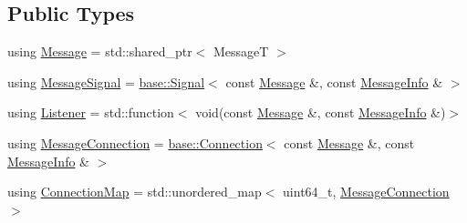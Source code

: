 \subsection*{Public Types}
\begin{DoxyCompactItemize}
\item 
using \hyperlink{classapollo_1_1cyber_1_1transport_1_1ListenerHandler_a52a658e4523db4704b6d7e97f326d774}{Message} = std\-::shared\-\_\-ptr$<$ Message\-T $>$
\item 
using \hyperlink{classapollo_1_1cyber_1_1transport_1_1ListenerHandler_a9ca5ce35c021aae1145e8e25a5fda0a0}{Message\-Signal} = \hyperlink{classapollo_1_1cyber_1_1base_1_1Signal}{base\-::\-Signal}$<$ const \hyperlink{classapollo_1_1cyber_1_1transport_1_1ListenerHandler_a52a658e4523db4704b6d7e97f326d774}{Message} \&, const \hyperlink{classapollo_1_1cyber_1_1transport_1_1MessageInfo}{Message\-Info} \& $>$
\item 
using \hyperlink{classapollo_1_1cyber_1_1transport_1_1ListenerHandler_a96764e623a89ce8a872d2e43b6408d98}{Listener} = std\-::function$<$ void(const \hyperlink{classapollo_1_1cyber_1_1transport_1_1ListenerHandler_a52a658e4523db4704b6d7e97f326d774}{Message} \&, const \hyperlink{classapollo_1_1cyber_1_1transport_1_1MessageInfo}{Message\-Info} \&)$>$
\item 
using \hyperlink{classapollo_1_1cyber_1_1transport_1_1ListenerHandler_a6f33e5f36f457a51129671f22c159ddf}{Message\-Connection} = \hyperlink{classapollo_1_1cyber_1_1base_1_1Connection}{base\-::\-Connection}$<$ const \hyperlink{classapollo_1_1cyber_1_1transport_1_1ListenerHandler_a52a658e4523db4704b6d7e97f326d774}{Message} \&, const \hyperlink{classapollo_1_1cyber_1_1transport_1_1MessageInfo}{Message\-Info} \& $>$
\item 
using \hyperlink{classapollo_1_1cyber_1_1transport_1_1ListenerHandler_a5a6f5bc05280412183b1d0f65ce5e683}{Connection\-Map} = std\-::unordered\-\_\-map$<$ uint64\-\_\-t, \hyperlink{classapollo_1_1cyber_1_1transport_1_1ListenerHandler_a6f33e5f36f457a51129671f22c159ddf}{Message\-Connection} $>$
\end{DoxyCompactItemize}

